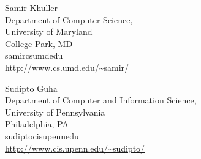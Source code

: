 \documentclass{tocforeword}
\begin{document}
\begin{tocauthors}
\begin{tocinfo}[khuller]
Samir Khuller \\
Department of Computer Science, \\
University of Maryland \\
College Park, MD \\
samir\tocat{}cs\tocdot{}umd\tocdot{}edu \\
\url{http://www.cs.umd.edu/~samir/}
\end{tocinfo}
\begin{tocinfo}[guha]
Sudipto Guha \\
Department of Computer and Information Science, \\
University of Pennsylvania \\
Philadelphia, PA \\
sudipto\tocat{}cis\tocdot{}upenn\tocdot{}edu \\
\url{http://www.cis.upenn.edu/~sudipto/}
\end{tocinfo}
\end{tocauthors}
\end{document}
